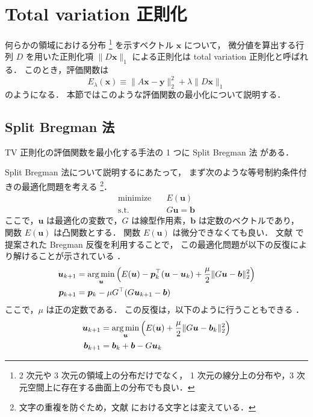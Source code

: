 %

\section{Total variation 正則化}

何らかの領域における分布
\footnote{2 次元や 3 次元の領域上の分布だけでなく，%
    1 次元の線分上の分布や，3 次元空間上に存在する曲面上の分布でも良い．}
を示すベクトル $\bm{x}$ について，
微分値を算出する行列 $D$ を用いた正則化項 $\|D \bm{x}\|_1$ による正則化は
total variation 正則化と呼ばれる．
このとき，評価関数は
\begin{equation}
    E_{\lambda}(\bm{x}) \equiv \|A \bm{x} - \bm{y}\|_2^2 + \lambda \|D \bm{x}\|_1
\end{equation}
のようになる．
本節ではこのような評価関数の最小化について説明する．

\subsection{Split Bregman 法}

TV 正則化の評価関数を最小化する手法の 1 つに
Split Bregman 法 \cite{Goldstein2009}
がある．

Split Bregman 法について説明するにあたって，
まず次のような等号制約条件付きの最適化問題を考える
\cite{Goldstein2009}
\footnote{文字の重複を防ぐため，文献 \cite{Goldstein2009} における文字とは変えている．}．
\begin{align}
    \text{minimize} \hspace{1em} & E(\bm{u})         \\
    \text{s.t.} \hspace{1em}     & G \bm{u} = \bm{b}
\end{align}
ここで，$\bm{u}$ は最適化の変数で，$G$ は線型作用素，$\bm{b}$ は定数のベクトルであり，
関数 $E(\bm{u})$ は凸関数とする．
関数 $E(\bm{u})$ は微分できなくても良い．
文献 \cite{Bregman1967} で提案された Bregman 反復を利用することで，
この最適化問題が以下の反復により解けることが示されている
\cite{Goldstein2009}．
\begin{align}
    \bm{u}_{k+1} & = \operatorname*{arg \thinspace min}_{\bm{u}} \left( E(\bm{u}) - \bm{p}_k^\top (\bm{u} - \bm{u}_k)
    + \frac{\mu}{2} \|G \bm{u} - \bm{b}\|_2^2 \right)
    \\
    \bm{p}_{k+1} & = \bm{p}_k - \mu G^\top (G \bm{u}_{k+1} - \bm{b})
\end{align}
ここで，$\mu$ は正の定数である．
この反復は，以下のように行うこともできる
\cite{Goldstein2009}．
\begin{align}
    \bm{u}_{k+1} & = \operatorname*{arg \thinspace min}_{\bm{u}} \left( E(\bm{u}) + \frac{\mu}{2} \|G \bm{u} - \bm{b}_k\|_2^2 \right)
    \\
    \bm{b}_{k+1} & = \bm{b}_k + \bm{b} - G \bm{u}_k
\end{align}

